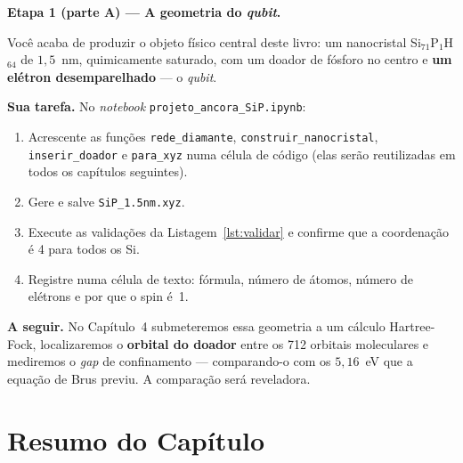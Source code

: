 \documentclass[11pt,a4paper,openany]{book}
\newcommand{\code}[1]{\texttt{#1}}
\newcommand{\qubit}{\emph{qubit}}
\begin{document}
\begin{caixaancora}
\textbf{Etapa 1 (parte A) --- A geometria do \qubit{}.}

Você acaba de produzir o objeto físico central deste livro: um nanocristal
Si$_{71}$P$_1$H$_{64}$ de $1{,}5$~nm, quimicamente saturado, com um doador de
fósforo no centro e \textbf{um elétron desemparelhado} --- o \qubit{}.

\vspace{0.3cm}
\textbf{Sua tarefa.} No \emph{notebook} \code{projeto\_ancora\_SiP.ipynb}:
\begin{enumerate}[leftmargin=*,nosep]
  \item Acrescente as funções \code{rede\_diamante}, \code{construir\_nanocristal},
        \code{inserir\_doador} e \code{para\_xyz} numa célula de código
        (elas serão reutilizadas em todos os capítulos seguintes).
  \item Gere e salve \code{SiP\_1.5nm.xyz}.
  \item Execute as validações da Listagem~\ref{lst:validar} e confirme que a
        coordenação é 4 para todos os Si.
  \item Registre numa célula de texto: fórmula, número de átomos, número de
        elétrons e por que o spin é~1.
\end{enumerate}

\vspace{0.3cm}
\textbf{A seguir.} No Capítulo~4 submeteremos essa geometria a um cálculo
Hartree-Fock, localizaremos o \textbf{orbital do doador} entre os 712 orbitais
moleculares e mediremos o \emph{gap} de confinamento --- comparando-o com os
$5{,}16$~eV que a equação de Brus previu. A comparação será reveladora.
\end{caixaancora}

\section*{Resumo do Capítulo}
\end{document}
